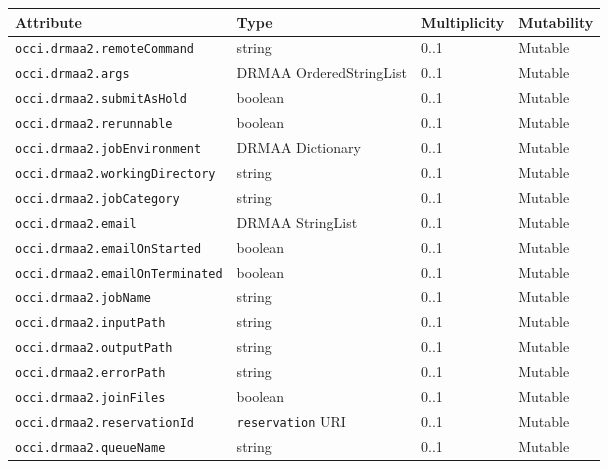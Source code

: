 \documentclass[10pt]{article}
\newcommand{\h}[1]{\lstinline|#1|}
\begin{document}
\begin{table}[ht]
\centering
\begin{tabularx}{\textwidth}{|l|X|l|l|}
\hline 
Attribute           & Type                         & Multiplicity & Mutability \\
\hline
\h{occi.drmaa2.remoteCommand}       & string                       & 0..1         & Mutable   \\ 
\h{occi.drmaa2.args}                & DRMAA OrderedStringList      & 0..1         & Mutable   \\
\h{occi.drmaa2.submitAsHold}        & boolean                      & 0..1         & Mutable   \\
\h{occi.drmaa2.rerunnable}          & boolean                      & 0..1         & Mutable   \\
\h{occi.drmaa2.jobEnvironment}      & DRMAA Dictionary             & 0..1         & Mutable   \\
\h{occi.drmaa2.workingDirectory}    & string                       & 0..1         & Mutable   \\
\h{occi.drmaa2.jobCategory}         & string                       & 0..1         & Mutable   \\
\h{occi.drmaa2.email}               & DRMAA StringList             & 0..1         & Mutable   \\
\h{occi.drmaa2.emailOnStarted}      & boolean                      & 0..1         & Mutable   \\
\h{occi.drmaa2.emailOnTerminated}   & boolean                      & 0..1         & Mutable   \\ 
\h{occi.drmaa2.jobName}             & string                       & 0..1         & Mutable   \\
\h{occi.drmaa2.inputPath}           & string                       & 0..1         & Mutable   \\
\h{occi.drmaa2.outputPath}          & string                       & 0..1         & Mutable   \\
\h{occi.drmaa2.errorPath}           & string                       & 0..1         & Mutable   \\
\h{occi.drmaa2.joinFiles}           & boolean                      & 0..1         & Mutable   \\
\h{occi.drmaa2.reservationId}       & \h{reservation} URI          & 0..1         & Mutable   \\
\h{occi.drmaa2.queueName}           & string                       & 0..1         & Mutable   \\

\end{tabularx}
\end{table}
\end{document}
